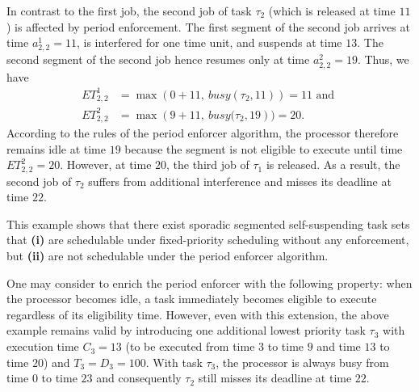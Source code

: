In contrast to the first job, the second job of task $\tau_2$ (which is released at time $11$) is affected by period enforcement. The first segment of the second job arrives at time $a^1_{2,2} = 11$, is interfered for one time unit, and suspends at time $13$. The  second segment of the second job hence resumes only at time $a^2_{2,2} = 19$. Thus, we have
\begin{align*}
	ET_{2,2}^1 & = \max\left(0 + 11,\ \mathit{busy}(\tau_2, 11)\right) = 11  \text{ and }
\\
	ET_{2,2}^2 & = \max\left(9 + 11,\ \mathit{busy}(\tau_2, 19\right) ) = 20.
\end{align*}
According to the rules of the period enforcer algorithm, the processor therefore remains idle at time $19$ because the segment is not eligible to execute until time $ET_{2,2}^2 = 20$. However, at time $20$, the third job of $\tau_1$ is released. As a result, the second job of $\tau_2$ suffers from additional interference and misses its deadline at time $22$.




This example shows that there exist sporadic segmented self-suspending task sets that   \textbf{(i)} are schedulable under fixed-priority scheduling without any enforcement, but \textbf{(ii)} are not schedulable under the period enforcer algorithm.


One may consider to enrich the period enforcer with the following property: when the processor becomes idle, a task immediately becomes eligible to execute regardless of its eligibility time. However, even with this extension, the above example remains valid by introducing one additional lowest priority task $\tau_3$ with execution time $C_3=13$ (to be executed from time $3$ to time $9$ and time $13$ to time $20$) and $T_3=D_3=100$. With task $\tau_3$, the processor is always busy from time $0$ to time $23$ and consequently $\tau_2$ still misses its deadline at time $22$.



